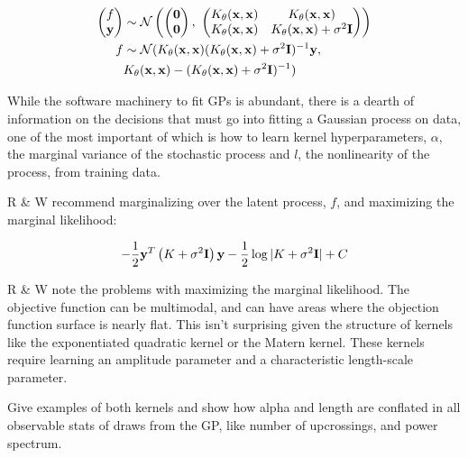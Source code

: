 \documentclass{article}
\newcommand{\lp}{\ensuremath{\left(}}
\newcommand{\rp}{\ensuremath{\right)}}
\begin{document}
\begin{align*}
      \begin{pmatrix} f\\ \mathbf{y} \\ \end{pmatrix} & \sim \mathcal{N} \lp
\begin{pmatrix} \mathbf{0} \\ \mathbf{0} \end{pmatrix} ,\,\, \begin{pmatrix}
  K_\theta(\mathbf{x},\mathbf{x}) & K_\theta(\mathbf{x},\mathbf{x})  \\
  K_\theta(\mathbf{x},\mathbf{x}) &  K_\theta(\mathbf{x},\mathbf{x}) + \sigma ^
  2 \mathbf{I}\\ \end{pmatrix} \rp \\ f & \sim
  \mathcal{N}(K_\theta(\mathbf{x},\mathbf{x})(K_\theta(\mathbf{x},\mathbf{x}) +
  \sigma ^ 2 \mathbf{I})^{-1}\mathbf{y},\\ & K_\theta(\mathbf{x},\mathbf{x}) -
  (K_\theta(\mathbf{x},\mathbf{x}) + \sigma ^ 2 \mathbf{I})^{-1})
\end{align*}

While the software machinery to fit GPs is abundant, there is a dearth of
information on the decisions that must go into fitting a Gaussian process on
data, one of the most important of which is how to learn kernel
hyperparameters, $\alpha$, the marginal variance of the stochastic process and
$l$, the nonlinearity of the process, from training data. 

R \& W recommend marginalizing over the latent process, $f$, and maximizing
the marginal likelihood:

\begin{align*}
-\dfrac{1}{2} \mathbf{y}^T \lp K + \sigma^2 \mathbf{I} \rp \mathbf{y} -
\dfrac{1}{2}\log|K + \sigma^2 \mathbf{I}| + C
\end{align*}

R \& W note the problems with maximizing the marginal likelihood. The objective
function can be multimodal, and can have areas where the objection function
surface is nearly flat. This isn't surprising given the structure of kernels
like the exponentiated quadratic kernel or the Matern kernel. These kernels
require learning an amplitude parameter and a characteristic
length-scale parameter.

Give examples of both kernels and show how alpha and length are conflated in
all observable stats of draws from the GP, like number of upcrossings, and
power spectrum.
\end{document}
